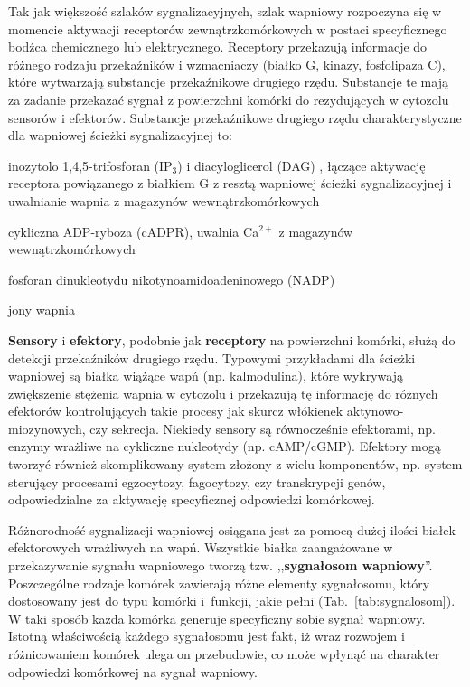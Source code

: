 Tak jak większość szlaków sygnalizacyjnych, szlak wapniowy rozpoczyna się w momencie aktywacji receptorów zewnątrzkomórkowych w postaci specyficznego bodźca chemicznego lub elektrycznego. Receptory przekazują informacje do różnego rodzaju przekaźników i wzmacniaczy (białko G, kinazy, fosfolipaza C), które wytwarzają substancje przekaźnikowe drugiego rzędu. Substancje te mają za zadanie przekazać sygnał z powierzchni komórki do rezydujących w cytozolu sensorów i efektorów. Substancje przekaźnikowe drugiego rzędu charakterystyczne dla wapniowej ścieżki sygnalizacyjnej to:

\begin{bulletList}
\item inozytolo 1,4,5-trifosforan (IP$_3$) i diacyloglicerol (DAG) , łączące aktywację receptora powiązanego z białkiem G z resztą wapniowej ścieżki sygnalizacyjnej i uwalnianie wapnia z magazynów wewnątrzkomórkowych
\item cykliczna ADP-ryboza (cADPR), uwalnia Ca$^{2+}$ z magazynów wewnątrzkomórkowych
\item fosforan dinukleotydu nikotynoamidoadeninowego (NADP)
\item jony wapnia
\end{bulletList}

\textbf{Sensory} i \textbf{efektory}, podobnie jak \textbf{receptory} na powierzchni komórki, służą do detekcji przekaźników drugiego rzędu. Typowymi przykładami dla ścieżki wapniowej są białka wiążące wapń (np. kalmodulina), które wykrywają zwiększenie stężenia wapnia w cytozolu i przekazują tę informację do różnych efektorów kontrolujących takie procesy jak skurcz włókienek aktynowo-miozynowych, czy sekrecja. Niekiedy sensory są równocześnie efektorami, np. enzymy wrażliwe na cykliczne nukleotydy (np. cAMP/cGMP). Efektory mogą tworzyć również skomplikowany system złożony z wielu komponentów, np. system sterujący procesami egzocytozy, fagocytozy, czy transkrypcji genów, odpowiedzialne za aktywację specyficznej odpowiedzi komórkowej.

Różnorodność sygnalizacji wapniowej osiągana jest za pomocą dużej ilości białek efektorowych wrażliwych na wapń. Wszystkie białka zaangażowane w przekazywanie sygnału wapniowego tworzą tzw. ,,\textbf{sygnałosom wapniowy}''. Poszczególne rodzaje komórek zawierają różne elementy sygnałosomu, który dostosowany jest do typu komórki i~funkcji, jakie pełni (Tab.~\ref{tab:sygnalosom}). W taki sposób każda komórka generuje specyficzny sobie sygnał wapniowy. Istotną właściwością każdego sygnałosomu jest fakt, iż wraz rozwojem i różnicowaniem komórek ulega on przebudowie, co może wpłynąć na charakter odpowiedzi komórkowej na sygnał wapniowy.

